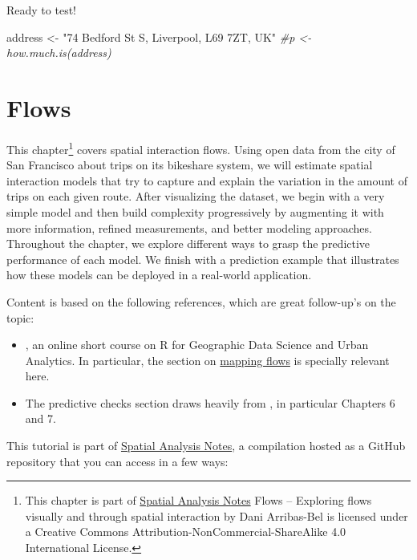 \documentclass[]{book}
\newenvironment{Shaded}{\begin{snugshade}}{\end{snugshade}}
\newcommand{\CommentTok}[1]{\textcolor[rgb]{0.56,0.35,0.01}{\textit{#1}}}
\newcommand{\NormalTok}[1]{#1}
\newcommand{\StringTok}[1]{\textcolor[rgb]{0.31,0.60,0.02}{#1}}
\providecommand{\tightlist}{%
  \setlength{\itemsep}{0pt}\setlength{\parskip}{0pt}}
\let\rmarkdownfootnote\footnote%
\def\footnote{\protect\rmarkdownfootnote}
\begin{document}
Ready to test!

\begin{Shaded}
\begin{Highlighting}[]
\NormalTok{address <-}\StringTok{ "74 Bedford St S, Liverpool, L69 7ZT, UK"}
\CommentTok{#p <- how.much.is(address)}
\end{Highlighting}
\end{Shaded}

\hypertarget{flows}{%
\chapter{Flows}\label{flows}}

This chapter\footnote{This chapter is part of \href{index.html}{Spatial Analysis Notes} {Flows -- Exploring flows visually and through spatial interaction} by Dani Arribas-Bel is licensed under a Creative Commons Attribution-NonCommercial-ShareAlike 4.0 International License.} covers spatial interaction flows. Using open data from the city of San Francisco about trips on its bikeshare system, we will estimate spatial interaction models that try to capture and explain the variation in the amount of trips on each given route. After visualizing the dataset, we begin with a very simple model and then build complexity progressively by augmenting it with more information, refined measurements, and better modeling approaches. Throughout the chapter, we explore different ways to grasp the predictive performance of each model. We finish with a prediction example that illustrates how these models can be deployed in a real-world application.

Content is based on the following references, which are great follow-up's on the topic:

\begin{itemize}
\tightlist
\item
  \citet{gds_ua17}, an online short course on R for Geographic Data Science and Urban Analytics. In particular, the section on \href{https://github.com/alexsingleton/GDS_UA_2017/tree/master/Mapping_Flows}{mapping flows} is specially relevant here.
\item
  The predictive checks section draws heavily from \citet{gelman2006data}, in particular Chapters 6 and 7.
\end{itemize}

This tutorial is part of \href{index.html}{Spatial Analysis Notes}, a compilation hosted as a GitHub repository that you can access in a few ways:
\end{document}
